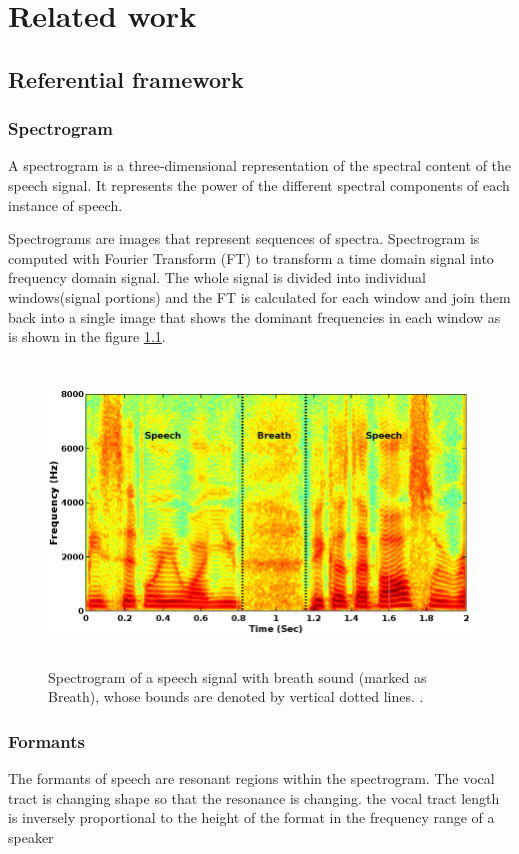 \chapter{Related work}

\section{Referential framework}

\subsection{Spectrogram}
A spectrogram is a three-dimensional representation of the spectral content of the speech signal. It represents the power of the different spectral components of each instance of speech.

Spectrograms are images that represent sequences of spectra. Spectrogram is computed with Fourier Transform (FT) to transform a time domain signal into frequency domain signal. The whole signal is divided into individual windows(signal portions) and the FT is calculated for each window and join them back into a single image that shows the dominant frequencies in
each window \cite{sribhashyam2021pattern, wyse2017audio} as is shown in the figure \ref{fig:spectrogram}.

\begin{figure}
    \centering
    \includegraphics[height=8cm]{figures/spectogram.png}
    \caption{Spectrogram of a speech signal with breath sound (marked as Breath), whose bounds are denoted by vertical dotted lines. .}
    \label{fig:spectrogram}
\end{figure}


\subsection{Formants}
The formants of speech are resonant regions within the spectrogram. The vocal tract is changing shape so that the resonance is changing. the vocal tract length is inversely proportional to the height of the format in the frequency range of a speaker

